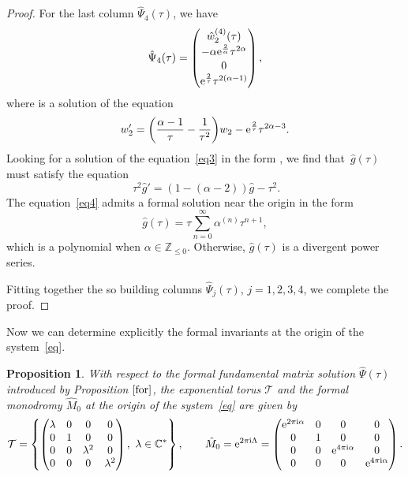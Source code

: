 \documentclass[pdftex]{sigma}
\numberwithin{equation}{section}
\newtheorem{Proposition}[Theorem]{Proposition}
 { \theoremstyle{definition}
\newtheorem{Definition}[Theorem]{Definition}
\newtheorem{Note}[Theorem]{Note}
\newtheorem{Example}[Theorem]{Example}
\newtheorem{Remark}[Theorem]{Remark} }
\begin{document}
\begin{proof}
 For the last column $\hat{\Psi}_4(\tau)$, we have
 \[
 \hat{\Psi}_4(\tau)=\begin{pmatrix}
 \hat{w}_2^{(4)}(\tau)\\[0.2ex]
 -\alpha {\rm e}^{\frac{2}{\alpha}} \tau^{2 \alpha}\\[0.2ex]
 0\\[0.2ex]
 {\rm e}^{\frac{2}{\tau}} \tau^{2 (\alpha-1)}
 	\end{pmatrix} ,
 \]
 where  is a solution of the equation
 \begin{equation}
 w_2'=\biggl(\frac{\alpha-1}{\tau} - \frac{1}{\tau^2}\biggr) w_2
 - {\rm e}^{\frac{2}{\tau}} \tau^{2 \alpha -3} .\label{eq3}
 \end{equation}
 Looking for a solution of the equation~\eqref{eq3} in the form
 , we find that~$\hat{g}(\tau)$ must satisfy the equation
 \begin{equation}\
 \tau^2 \hat{g}'=(1- (\alpha-2)) \hat{g} - \tau^2 .\label{eq4}
 \end{equation}
 The equation~\eqref{eq4} admits a formal solution near the origin in the form
 \[
 \hat{g}(\tau)=\tau \sum_{n=0}^{\infty} \alpha^{(n)} \tau^{n+1},
 \]
 which is a polynomial when $\alpha\in\mathbb{Z}_{\leq 0}$. Otherwise, $\hat{g}(\tau)$ is a divergent power series.

 Fitting together the so building columns $\hat{\Psi}_j(\tau)$, $j=1, 2, 3, 4$, we complete the proof.
 \end{proof}



 Now we can determine explicitly the formal invariants at the origin of the system~\eqref{eq}.

 \begin{Proposition}%
 With respect to the formal fundamental matrix solution $\hat{\Psi}(\tau)$ introduced by Proposition $\ref{for}$, the
 exponential torus $\mathcal{T}$ and the formal monodromy $\hat{M}_0$ at the origin of the system~\eqref{eq} are given by
 \[
 \mathcal{T}=\left\{\begin{pmatrix}
 \lambda & 0 & 0 & 0\\
 0 & 1 & 0 & 0\\
 0 & 0 & \lambda^2 & 0\\
 0 & 0 & 0 & \lambda^2
 \end{pmatrix},\ \lambda\in\mathbb{C}^*\right\},\qquad
 \hat{M}_0={\rm e}^{2 \pi {\rm i} \Lambda}=\begin{pmatrix}
 {\rm e}^{2 \pi {\rm i} \alpha} & 0 & 0 & 0\\
 0 & 1 & 0 & 0\\
 0 & 0 & {\rm e}^{4 \pi {\rm i} \alpha} & 0\\
 0 & 0 & 0 & {\rm e}^{4 \pi {\rm i} \alpha}
 \end{pmatrix} .
 \]
 \end{Proposition}
\end{document}
